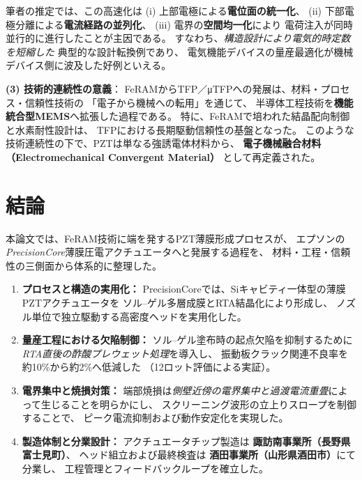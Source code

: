 \documentclass[conference]{IEEEtran}
\begin{document}
筆者の推定では、この高速化は
(i) 上部電極による\textbf{電位面の統一化}、
(ii) 下部電極分離による\textbf{電流経路の並列化}、
(iii) 電界の\textbf{空間均一化}により
電荷注入が同時並行的に進行したことが主因である。
すなわち、\emph{構造設計により電気的時定数を短縮した}
典型的な設計転換例であり、
電気機能デバイスの量産最適化が機械デバイス側に波及した好例といえる。

\medskip
\noindent
\textbf{(3) 技術的連続性の意義}：
FeRAMからTFP／μTFPへの発展は、材料・プロセス・信頼性技術の
「電子から機械への転用」を通じて、
半導体工程技術を\textbf{機能統合型MEMS}へ拡張した過程である。
特に、FeRAMで培われた結晶配向制御と水素耐性設計は、
TFPにおける長期駆動信頼性の基盤となった。
このような技術連続性の下で、PZTは単なる強誘電体材料から、
\textbf{電子機械融合材料（Electromechanical Convergent Material）}
として再定義された。

\section{結論}
本論文では、FeRAM技術に端を発するPZT薄膜形成プロセスが、
エプソンの\textit{PrecisionCore}薄膜圧電アクチュエータへと発展する過程を、
材料・工程・信頼性の三側面から体系的に整理した。

\begin{enumerate}[label=(\arabic*)]
  \item \textbf{プロセスと構造の実用化：}
  PrecisionCoreでは、Siキャビティ一体型の薄膜PZTアクチュエータを
  ソル–ゲル多層成膜とRTA結晶化により形成し、
  ノズル単位で独立駆動する高密度ヘッドを実用化した\cite{uemura2014mems}。

  \item \textbf{量産工程における欠陥制御：}
  ソル–ゲル塗布時の起点欠陥を抑制するために
  \emph{RTA直後の酢酸プレウェット処理}を導入し、
  振動板クラック関連不良率を約10\%から約2\%へ低減した
  （12ロット評価による実証）。

  \item \textbf{電界集中と焼損対策：}
  端部焼損は\emph{側壁近傍の電界集中と過渡電流重畳}によって生じることを明らかにし、
  スクリーニング波形の立上りスロープを制御することで、
  ピーク電流抑制および動作安定化を実現した。

  \item \textbf{製造体制と分業設計：}
  アクチュエータチップ製造は
  \textbf{諏訪南事業所（長野県富士見町）}、
  ヘッド組立および最終検査は
  \textbf{酒田事業所（山形県酒田市）}にて分業し、
  工程管理とフィードバックループを確立した。
\end{enumerate}
\end{document}
